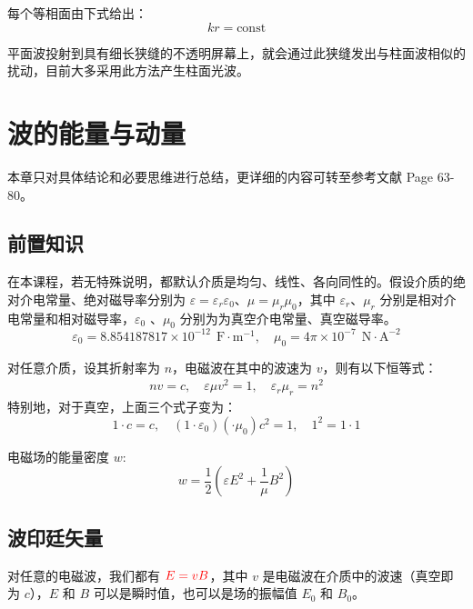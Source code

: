 \documentclass[UTF8]{report}
\theoremstyle{MyLineTheoremStyle} %
\theoremstyle{MyBlockTheoremStyle} %
\theoremstyle{MySubsubsectionStyle} %
\begin{document}
每个等相面由下式给出：
\begin{equation}
    kr = \text{const}
\end{equation}

平面波投射到具有细长狭缝的不透明屏幕上，就会通过此狭缝发出与柱面波相似的扰动，目前大多采用此方法产生柱面光波。

\section{波的能量与动量}

本章只对具体结论和必要思维进行总结，更详细的内容可转至参考文献 \cite{Optics} Page 63-80。

\subsection{前置知识}

在本课程，若无特殊说明，都默认介质是均匀、线性、各向同性的。假设介质的绝对介电常量、绝对磁导率分别为 $\varepsilon = \varepsilon_r \varepsilon_0$、$\mu = \mu_r \mu_0$，其中 $\varepsilon_r$、$\mu_r$ 分别是相对介电常量和相对磁导率，$\varepsilon_0 $ 、$\mu_0$ 分别为为真空介电常量、真空磁导率。
\begin{equation}
    \varepsilon_0 = 8.854187817 \times 10^{-12}\ \ \mathrm{F\cdot m^{-1}},\quad \mu_0 = 4 \pi \times 10^{-7} \ \ \mathrm{N\cdot A^{-2}} 
\end{equation}

对任意介质，设其折射率为 $n$，电磁波在其中的波速为 $v$，则有以下恒等式：
\begin{gather}
\boxed{
    nv = c ,\quad \varepsilon \mu v^2= 1,\quad \varepsilon_r \mu_r = n^2 
}
\end{gather}
特别地，对于真空，上面三个式子变为：
\begin{equation}
1 \cdot c = c ,\quad (1\cdot \varepsilon_0) (\cdot \mu_0) c^2  = 1,\quad 1^2 = 1\cdot 1
\end{equation}

电磁场的能量密度 $w$: 
\begin{equation}
w = \frac{1}{2}\left( \varepsilon E^2 + \frac{1}{\mu} B^2 \right)
\end{equation}

\subsection{波印廷矢量}

对任意的电磁波，我们都有 $\displaystyle {\color{red} E = vB}$，其中 $v$ 是电磁波在介质中的波速（真空即为 $c$），$E$ 和 $B$ 可以是瞬时值，也可以是场的振幅值 $E_0$ 和 $B_0$。
\end{document}
